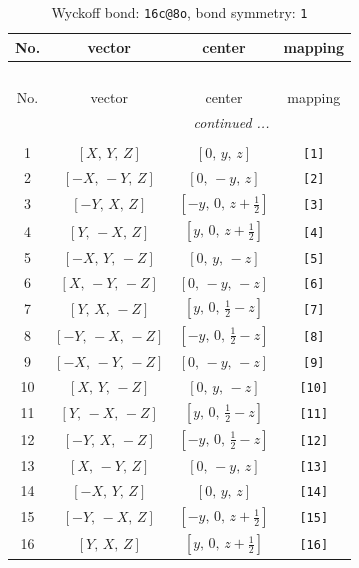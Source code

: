 \documentclass[fleqn,8pt]{jsarticle}
\begin{document}
\begin{longtable}{cccc}
\caption{Wyckoff bond: {\tt 16c@8o}, bond symmetry: {\tt 1}}
 \\
 \hline \hline
No. & vector & center & mapping \\ \hline \endfirsthead

\multicolumn{3}{l}{\tablename\ \thetable{}} \\
 \hline \hline
No. & vector & center & mapping \\ \hline \endhead

 \hline \hline
\multicolumn{3}{r}{\footnotesize\it continued ...} \\ \endfoot

 \hline \hline
\multicolumn{3}{r}{} \\ \endlastfoot

1 & $\left[ X,\, Y,\, Z \right]$ & $\left[ 0,\, y,\, z \right]$ & {\tt [1]} \\ \hline
2 & $\left[ - X,\, - Y,\, Z \right]$ & $\left[ 0,\, - y,\, z \right]$ & {\tt [2]} \\ \hline
3 & $\left[ - Y,\, X,\, Z \right]$ & $\left[ - y,\, 0,\, z + \frac{1}{2} \right]$ & {\tt [3]} \\ \hline
4 & $\left[ Y,\, - X,\, Z \right]$ & $\left[ y,\, 0,\, z + \frac{1}{2} \right]$ & {\tt [4]} \\ \hline
5 & $\left[ - X,\, Y,\, - Z \right]$ & $\left[ 0,\, y,\, - z \right]$ & {\tt [5]} \\ \hline
6 & $\left[ X,\, - Y,\, - Z \right]$ & $\left[ 0,\, - y,\, - z \right]$ & {\tt [6]} \\ \hline
7 & $\left[ Y,\, X,\, - Z \right]$ & $\left[ y,\, 0,\, \frac{1}{2} - z \right]$ & {\tt [7]} \\ \hline
8 & $\left[ - Y,\, - X,\, - Z \right]$ & $\left[ - y,\, 0,\, \frac{1}{2} - z \right]$ & {\tt [8]} \\ \hline
9 & $\left[ - X,\, - Y,\, - Z \right]$ & $\left[ 0,\, - y,\, - z \right]$ & {\tt [9]} \\ \hline
10 & $\left[ X,\, Y,\, - Z \right]$ & $\left[ 0,\, y,\, - z \right]$ & {\tt [10]} \\ \hline
11 & $\left[ Y,\, - X,\, - Z \right]$ & $\left[ y,\, 0,\, \frac{1}{2} - z \right]$ & {\tt [11]} \\ \hline
12 & $\left[ - Y,\, X,\, - Z \right]$ & $\left[ - y,\, 0,\, \frac{1}{2} - z \right]$ & {\tt [12]} \\ \hline
13 & $\left[ X,\, - Y,\, Z \right]$ & $\left[ 0,\, - y,\, z \right]$ & {\tt [13]} \\ \hline
14 & $\left[ - X,\, Y,\, Z \right]$ & $\left[ 0,\, y,\, z \right]$ & {\tt [14]} \\ \hline
15 & $\left[ - Y,\, - X,\, Z \right]$ & $\left[ - y,\, 0,\, z + \frac{1}{2} \right]$ & {\tt [15]} \\ \hline
16 & $\left[ Y,\, X,\, Z \right]$ & $\left[ y,\, 0,\, z + \frac{1}{2} \right]$ & {\tt [16]} \\
\end{longtable}
\end{document}
